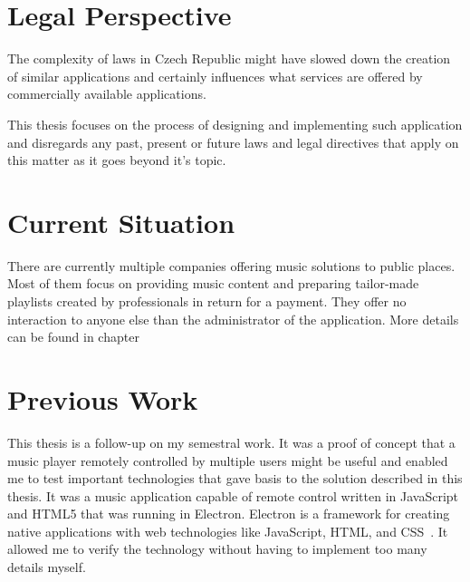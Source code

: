 \section*{Legal Perspective}

The complexity of laws in Czech Republic might have slowed down the creation of similar applications and certainly influences what services are offered by commercially available applications.
\par
This thesis focuses on the process of designing and implementing such application and disregards any past, present or future laws and legal directives that apply on this matter as it goes beyond it's topic.

\section*{Current Situation}

There are currently multiple companies offering music solutions to public places. Most of them focus on providing music content and preparing tailor-made playlists created by professionals in return for a payment. They offer no interaction to anyone else than the administrator of the application. More details can be found in chapter 


\section*{Previous Work}

This thesis is a follow-up on my semestral work. It was a proof of concept that a music player remotely controlled by multiple users might be useful and enabled me to test important technologies that gave basis to the solution described in this thesis. It was a music application capable of remote control written in JavaScript and HTML5 that was running in Electron. Electron is a framework for creating native applications with web technologies like JavaScript, HTML, and CSS~\citep{electron}. It allowed me to verify the technology without having to implement too many details myself.




